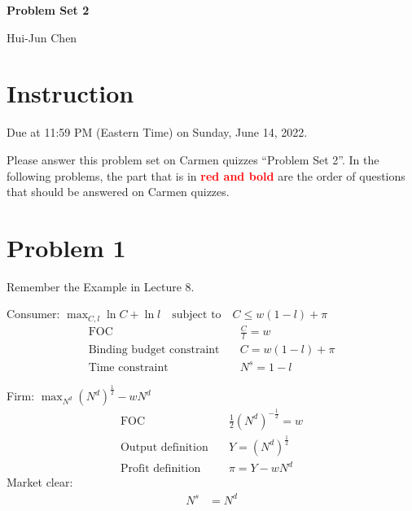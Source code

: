 \documentclass[14pt]{extarticle}
\newcommand{\red}[1]{\textcolor{red}{#1}}
\begin{document}
\centerline{\huge\bf Problem Set 2}
\smallskip
\centerline{\LARGE Hui-Jun Chen}

\medskip

\section*{Instruction}

Due at 11:59 PM (Eastern Time) on Sunday, June 14, 2022.

Please answer this problem set on Carmen quizzes ``Problem Set 2''. In the following problems, the part that is in \textbf{\red{red and bold}} are the order of questions that should be answered on Carmen quizzes.


\section*{Problem 1}

Remember the Example in Lecture 8.

    Consumer: $ \max_{C, l} \ln C + \ln l \quad \text{subject to} \quad C \le w( 1-l ) + \pi $
    \begin{align}
        \text{FOC} \quad
            & \frac{C}{l} = w
            \label{eq:consumerFOC}
        \\
        \text{Binding budget constraint} \quad
            & C = w ( 1-l ) + \pi
            \label{eq:binding_budget}
        \\
        \text{Time constraint} \quad
            & N^{s} = 1 - l
            \label{eq:time_budget}
    \end{align}

    Firm: $ \max_{N^{d}} ( N^{d} )^{\frac{1}{2}} - w N^{d} $
    \begin{align}
        \text{FOC} \quad
            & \frac{1}{2} ( N^{d} )^{- \frac{1}{2}} = w
            \label{eq:firmFOC}
        \\
        \text{Output definition} \quad
            & Y = ( N^{d} )^{\frac{1}{2}}
            \label{eq:outputDef}
        \\
        \text{Profit definition} \quad
            & \pi = Y - w N^{d}
            \label{eq:profitDef}
    \end{align}
    Market clear:
    \begin{align}
        N^{s} & = N^{d}
        \label{eq:laborClear}
    \end{align}
\end{document}
